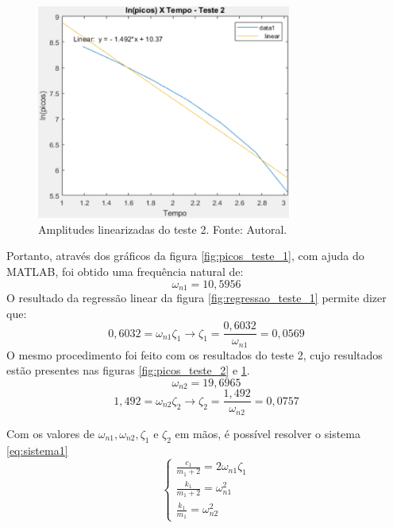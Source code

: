 \documentclass{ifacconf}
\begin{document}
\begin{figure}[!htb]
  \begin{center}
  \includegraphics[width=8.4cm]{figures/regressao_teste_2.png}    %
  \caption{Amplitudes linearizadas do teste 2. Fonte: Autoral.} 
  \label{fig:regressao_teste_2}
  \end{center}
\end{figure}

Portanto, através dos gráficos da figura \ref{fig:picos_teste_1}, com ajuda do MATLAB, foi obtido uma frequência
natural de:
\begin{equation}
  \omega_{n1} = 10,5956
\end{equation}
O resultado da regressão linear da figura \ref{fig:regressao_teste_1} permite dizer que:
\begin{equation}
  0,6032 = \omega_{n1} \zeta_1  \rightarrow  \zeta_1 = \frac{0,6032}{\omega_{n1}} = 0,0569
\end{equation}
O mesmo procedimento foi feito com os resultados do teste 2, cujo resultados estão presentes nas figuras \ref{fig:picos_teste_2} e \ref{fig:regressao_teste_2}.
\begin{equation}
  \omega_{n2} = 19,6965
\end{equation}
\begin{equation}
  1,492 = \omega_{n2} \zeta_2  \rightarrow  \zeta_2 = \frac{1,492}{\omega_{n2}} = 0,0757
\end{equation}

Com os valores de $\omega_{n1}, \omega_{n2}, \zeta_1$ e $\zeta_2$ em mãos, é possível resolver o sistema \ref{eq:sistema1}
\begin{equation}
  \left\{
\begin{array}{lr}
  \frac{c_1}{m_1 + 2} = 2\omega_{n1} \zeta_1 \\
  \frac{k_1}{m_1 + 2} = \omega_{n1}^2 \\
  \frac{k_1}{m_1} = \omega_{n2}^2
\end{array}
\right.
\end{equation}
\end{document}
